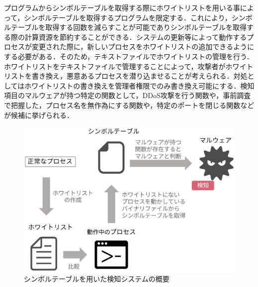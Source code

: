 プログラムからシンボルテーブルを取得する際にホワイトリストを用いる事によって，シンボルテーブルを取得するプログラムを限定する．これにより，シンボルテーブルを取得する回数を減らすことが可能でありシンボルテーブルを取得する際の計算資源を節約することができる．システムの更新等によって動作するプロセスが変更された際に，新しいプロセスをホワイトリストの追加できるようにする必要がある．そのため，テキストファイルでホワイトリストの管理を行う．ホワイトリストをテキストファイルで管理することによって，攻撃者がホワイトリストを書き換え，悪意あるプロセスを潜り込ませることが考えられる．対処としてはホワイトリストの書き換えを管理者権限でのみ書き換え可能にする．検知項目のマルウェアが持つ特定の関数として，DDoS攻撃を行う関数や，事前調査で把握した，プロセス名を無作為にする関数や，特定のポートを閉じる関数などが候補に挙げられる．
 
 \begin{figure}[h]
 \centering
    \includegraphics[width=120mm]{figures/system.eps}
    \caption{シンボルテーブルを用いた検知システムの概要}
    \label{fig:symbol}
 \end{figure}
 
\newpage



